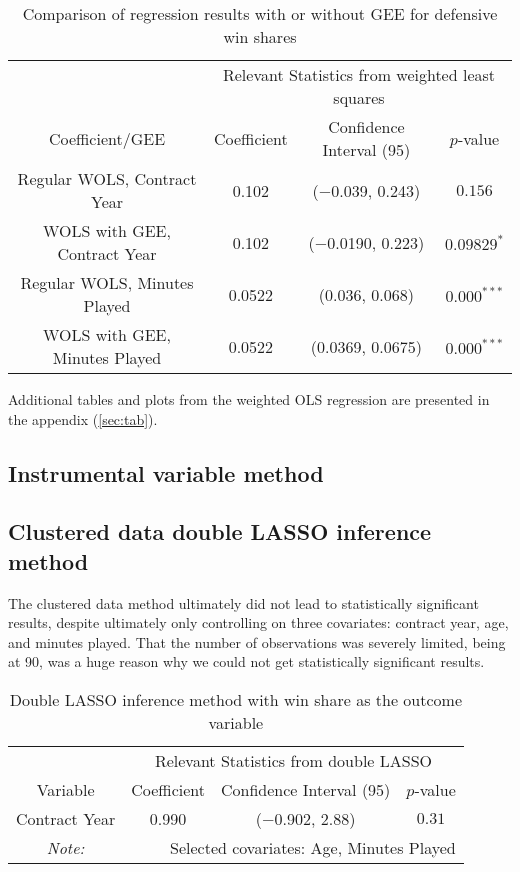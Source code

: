 \documentclass[12pt]{article}
\begin{document}
	\begin{table}[!htbp]
		\centering
		\caption{Comparison of regression results with or without GEE for defensive win shares}
		\label{geelmcomparisond} 
		\begin{tabular}{*4c}
			\toprule
			& \multicolumn{3}{c}{Relevant Statistics from weighted least squares} \\
			\cmidrule(lr){2-4}
			Coefficient/GEE & Coefficient  & Confidence Interval (95) & $p$-value \\
			\midrule
			Regular WOLS, Contract Year & 0.102       & ($-$0.039, 0.243) & $0.156$       \\
			WOLS with GEE, Contract Year & 0.102      & ($-$0.0190, 0.223)       & $0.09829^{*}$ \\
			Regular WOLS, Minutes Played & 0.0522       & (0.036, 0.068) & $0.000^{***}$ \\
			WOLS with GEE, Minutes Played & 0.0522 & (0.0369, 0.0675)       & $0.000^{***}$       \\
			\bottomrule
		\end{tabular}
	\end{table}
	
	Additional tables and plots from the weighted OLS regression are presented in the appendix (\ref{sec:tab}).
	
	\pagebreak
	
	\subsection{Instrumental variable method}
	
	\subsection{Clustered data double LASSO inference method}
	
	The clustered data method ultimately did not lead to statistically significant results, despite ultimately only controlling on three covariates: contract year, age, and minutes played. That the number of observations was severely limited, being at 90, was a huge reason why we could not get statistically significant results.
	
	\begin{table}[!htbp]
		\centering
		\caption{Double LASSO inference method with win share as the outcome variable}
		\label{lassows} 
		\begin{tabular}{*4c}
			\toprule
			& \multicolumn{3}{c}{Relevant Statistics from double LASSO} \\
			\cmidrule(lr){2-4}
			Variable & Coefficient  & Confidence Interval (95) & $p$-value \\
			\midrule
			Contract Year & 0.990       & ($-$0.902, 2.88) & $0.31$       \\
			\bottomrule
			\textit{Note:}  & \multicolumn{3}{r}{Selected covariates: Age, Minutes Played} \\ 
		\end{tabular}
	\end{table}
\end{document}
